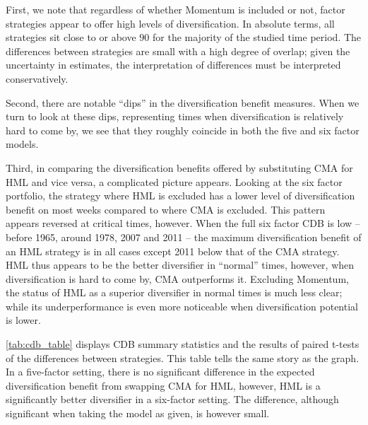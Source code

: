First, we note that regardless of whether Momentum is included or not, factor strategies appear to offer high levels of diversification. In absolute terms, all strategies sit close to or above $90$ for the majority of the studied time period. The differences between strategies are small with a high degree of overlap; given the uncertainty in estimates, the interpretation of differences must be interpreted conservatively.

Second, there are notable ``dips'' in the diversification benefit measures. When we turn to look at these dips, representing times when diversification is relatively hard to come by, we see that they roughly coincide in both the five and six factor models.

Third, in comparing the diversification benefits offered by substituting CMA for HML and vice versa, a complicated picture appears. Looking at the six factor portfolio, the strategy where HML is excluded has a lower level of diversification benefit on most weeks compared to where CMA is excluded. This pattern appears reversed at critical times, however. When the full six factor CDB is low -- before 1965, around 1978, 2007 and 2011 -- the maximum diversification benefit of an HML strategy is in all cases except 2011 below that of the CMA strategy. HML thus appears to be the better diversifier in ``normal'' times, however, when diversification is hard to come by, CMA outperforms it. Excluding Momentum, the status of HML as a superior diversifier in normal times is much less clear; while its underperformance is even more noticeable when diversification potential is lower.

\autoref{tab:cdb_table} displays CDB summary statistics and the results of paired t-tests of the differences between strategies. This table tells the same story as the graph. In a five-factor setting, there is no significant difference in the expected diversification benefit from swapping CMA for HML, however, HML is a significantly better diversifier in a six-factor setting. The difference, although significant when taking the model as given, is however small.





